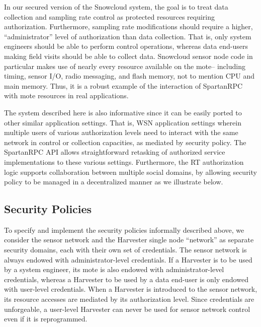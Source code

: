 \snowcloudfig

In our secured version of the Snowcloud system, the goal is to treat
data collection and sampling rate control as protected resources
requiring authorization. Furthermore, sampling rate modifications
should require a higher, ``administrator'' level of authorization than
data collection. That is, only system engineers should be able to
perform control operations, whereas data end-users making field visits
should be able to collect data.  Snowcloud sensor node code in
particular makes use of nearly every resource available on the mote--
including timing, sensor I/O, radio messaging, and flash memory, not
to mention CPU and main memory. Thus, it is a robust example of the
interaction of SpartanRPC with mote resources in real applications.

The system described here is also informative since it can be easily
ported to other similar application settings. That is, WSN application
settings wherein multiple users of various authorization levels need
to interact with the same network in control or collection capacities,
as mediated by security policy. The SpartanRPC API allows
straightforward retasking of authorized service implementations to
these various settings. Furthermore, the RT authorization logic
supports collaboration between multiple social domains, by allowing
security policy to be managed in a decentralized manner as we
illustrate below.

\subsection{Security Policies}

To specify and implement the security policies informally described
above, we consider the sensor network and the Harvester single node
``network'' as separate security domains, each with their own set of
credentials. The sensor network is always endowed with
administrator-level credentials. If a Harvester is to be used by a
system engineer, its mote is also endowed with administrator-level
credentials, whereas a Harvester to be used by a data end-user is only
endowed with user-level credentials. When a Harvester is introduced to
the sensor network, its resource accesses are mediated by its
authorization level. Since credentials are unforgeable, a user-level
Harvester can never be used for sensor network control even if it is
reprogrammed.

